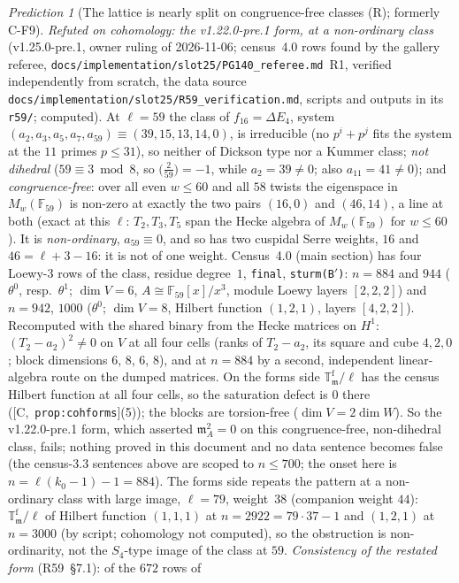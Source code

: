\documentclass[11pt]{article}
\theoremstyle{remark}
\newtheorem{prediction}[theorem]{Prediction}
\newcommand{\F}{\mathbb{F}}
\newcommand{\T}{\mathbb{T}}
\newcommand{\m}{\mathfrak{m}}
\newcommand{\HA}[1]{[C,~\texttt{#1}]}      %
\begin{document}
\begin{prediction}[The lattice is nearly split on congruence-free classes (R); formerly C-F9]
\emph{Refuted on cohomology: the v1.22.0-pre.1 form, at a non-ordinary class} (v1.25.0-pre.1, owner ruling of 2026-11-06; census~4.0 rows found by the
gallery referee, \texttt{docs/implementation/slot25/PG140\_referee.md}~R1, verified independently from scratch, the data source
\texttt{docs/implementation/slot25/R59\_verification.md}, scripts and outputs in its \texttt{r59/}; computed). At $\ell=59$ the class of $f_{16}=\Delta E_4$,
system $(a_2,a_3,a_5,a_7,a_{59})\equiv(39,15,13,14,0)$, is irreducible (no $p^{i}+p^{j}$ fits the system at the $11$ primes $p\le31$), so neither of Dickson
type nor a Kummer class; \emph{not dihedral} ($59\equiv3\bmod8$, so $\bigl(\tfrac{2}{59}\bigr)=-1$, while $a_2=39\ne0$; also $a_{11}=41\ne0$); and
\emph{congruence-free}: over all even $w\le60$ and all $58$ twists the eigenspace in $M_w(\F_{59})$ is non-zero at exactly the two pairs $(16,0)$ and
$(46,14)$, a line at both (exact at this $\ell$: $T_2,T_3,T_5$ span the Hecke algebra of $M_w(\F_{59})$ for $w\le60$). It is \emph{non-ordinary},
$a_{59}\equiv0$, and so has two cuspidal Serre weights, $16$ and $46=\ell+3-16$: it is not of one weight. Census~4.0 (main section) has four Loewy-$3$ rows
of the class, residue degree~$1$, \texttt{final}, \texttt{sturm(B$'$)}: $n=884$ and $944$ ($\theta^0$, resp.\ $\theta^1$; $\dim V=6$,
$A\cong\F_{59}[x]/x^{3}$, module Loewy layers $[2,2,2]$) and $n=942$, $1000$ ($\theta^0$; $\dim V=8$, Hilbert function $(1,2,1)$, layers $[4,2,2]$).
Recomputed with the shared binary from the Hecke matrices on $H^1$: $(T_2-a_2)^2\ne0$ on $V$ at all four cells (ranks of $T_2-a_2$, its square and cube
$4,2,0$; block dimensions $6$, $8$, $6$, $8$), and at $n=884$ by a second, independent linear-algebra route on the dumped matrices. On the forms side
$\T^{\mathrm f}_\m/\ell$ has the census Hilbert function at all four cells, so the saturation defect is $0$ there (\HA{prop:cohforms}(5)); the blocks are
torsion-free ($\dim V=2\dim W$). So the v1.22.0-pre.1 form, which asserted $\m_A^2=0$ on this congruence-free, non-dihedral class, fails; nothing proved
in this document and no data sentence becomes false (the census-3.3 sentences above are scoped to $n\le700$; the onset here is
$n=\ell(k_0-1)-1=884$). The forms side repeats the pattern at a non-ordinary class with large image, $\ell=79$, weight~$38$ (companion weight $44$):
$\T^{\mathrm f}_\m/\ell$ of Hilbert function $(1,1,1)$ at $n=2922=79\cdot37-1$ and $(1,2,1)$ at $n=3000$ (by script; cohomology not computed), so the
obstruction is non-ordinarity, not the $S_4$-type image of the class at $59$. \emph{Consistency of the restated form} (R59~\S7.1): of the $672$ rows of

\end{prediction}
\end{document}
